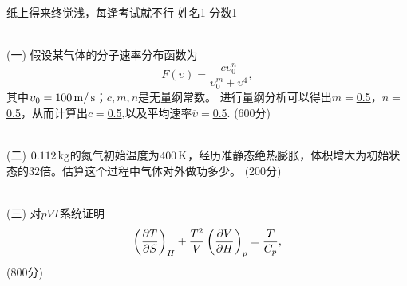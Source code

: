 \documentclass[12pt,CJK]{article}
\def\mark#1{{\color{blue} (#1分)}}
\begin{document}
\bch


{\blue 纸上得来终觉浅，每逢考试就不行} {} 姓名\uline{1} {\hskip 0.5in} 分数\uline{1}

{\vskip 0.3in}
\ \\
(一) 假设某气体的分子速率分布函数为
$$F(\upsilon) = \frac{c\upsilon_0^n}{\upsilon_0^m + \upsilon^4},$$
其中$\upsilon_0 = 100\,\mathrm{m}/\,\mathrm{s}$；$c, m,n$是无量纲常数。
进行量纲分析可以得出$m = $\uline{0.5}，$n=$\uline{0.5}，从而计算出$c=$\uline{0.5},以及平均速率$\overline{\upsilon} = $\uline{0.5}.  \mark{600}

{\vskip 0.1in}
\ \\
(二) $0.112\,\mathrm{kg}$的氮气初始温度为$400\,\mathrm{K}$，经历准静态绝热膨胀，体积增大为初始状态的$32$倍。估算这个过程中气体对外做功多少。\mark{200}

{\vskip 2.5in}
\ \\
(三) 对$pVT$系统证明 
  $$\left(\frac{\partial T}{\partial S}\right)_{H} +\frac{T^2}{V} \left(\frac{\partial V}{\partial H}\right)_{p} = \frac{T}{C_p}, $$
  \mark{800}



\ech
\end{document}

